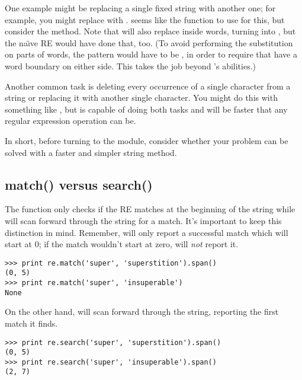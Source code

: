 \documentclass{howto}
\begin{document}
One example might be replacing a single fixed string with another
one; for example, you might replace 
with .   seems like the function to use for
this, but consider the  method.  Note that 
 will also replace  inside
words, turning  into , but the 
na{\"\i}ve RE  would have done that, too.  (To avoid performing
the substitution on parts of words, the pattern would have to be
, in order to require that  have a
word boundary on either side.  This takes the job beyond 
's abilities.)

Another common task is deleting every occurrence of a single character
from a string or replacing it with another single character.  You
might do this with something like , but
 is capable of doing both tasks
and will be faster that any regular expression operation can be.

In short, before turning to the  module, consider whether
your problem can be solved with a faster and simpler string method.

\subsection{match() versus search()}

The  function only checks if the RE matches at
the beginning of the string while  will scan
forward through the string for a match.
It's important to keep this distinction in mind.  Remember, 
 will only report a successful match which
will start at 0; if the match wouldn't start at zero, 
 will \emph{not} report it.

\begin{verbatim}
>>> print re.match('super', 'superstition').span()  
(0, 5)
>>> print re.match('super', 'insuperable')    
None
\end{verbatim}

On the other hand,  will scan forward through the
string, reporting the first match it finds.

\begin{verbatim}
>>> print re.search('super', 'superstition').span()
(0, 5)
>>> print re.search('super', 'insuperable').span()
(2, 7)
\end{verbatim}
\end{document}
